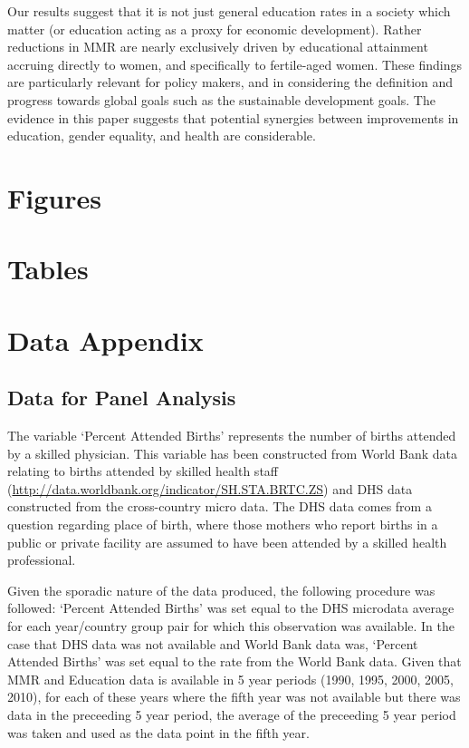 \documentclass{article}[12pt,subeqn]
\newcommand{\MMRfolder}{"."}
\begin{document}
\begin{spacing}{1.4}
Our results suggest that it is not just general education rates in a society
which matter (or education acting as a proxy for economic development). Rather
reductions in MMR are nearly exclusively driven by educational attainment
accruing directly to women, and specifically to fertile-aged women.  These
findings are particularly relevant for policy makers, and in considering the
definition and progress towards global goals such as the sustainable
development goals.  The evidence in this paper suggests that potential synergies
between improvements in education, gender equality, and health are considerable.



\newpage
\section*{Figures}


\section*{Tables}
%





\newpage

\newpage


\appendix
\section{Data Appendix}
\label{scn:dataappendix}
\subsection{Data for Panel Analysis}
The variable `Percent Attended Births' represents the number of births attended 
by a skilled physician.  This variable has been constructed from World Bank data 
relating to births attended by skilled health staff 
(\url{http://data.worldbank.org/indicator/SH.STA.BRTC.ZS}) and DHS data 
constructed from the cross-country micro data. The DHS data comes from a 
question regarding place of birth, where those mothers who report births in a 
public or private facility are assumed to have been attended by a skilled health 
professional.  

Given the sporadic nature of the data produced, the following procedure was 
followed: `Percent Attended Births' was set equal to the DHS microdata average 
for each year/country group pair for which this observation was available.  In 
the case that DHS data was not available and World Bank data was, `Percent 
Attended Births' was set equal to the rate from the World Bank data.  Given that 
MMR and Education data is available in 5 year periods (1990, 1995, 2000, 2005, 
2010), for each of these years where the fifth year was not available but there 
was data in the preceeding 5 year period, the average of the preceeding 5 year 
period was taken and used as the data point in the fifth year.


\end{spacing}
\end{document}
